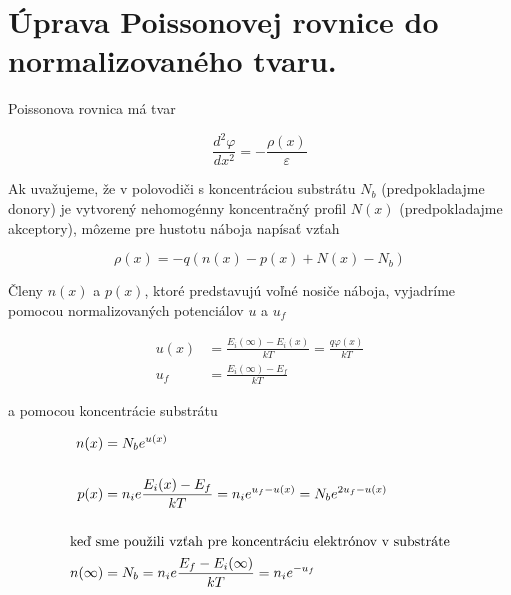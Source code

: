 
\chapter{Úprava Poissonovej rovnice do normalizovaného tvaru.} %
\label{app:AppendixB} %

Poissonova rovnica má tvar

\begin{equation}\label{eq:B.1}
\frac{d^{2}\varphi}{dx^2} = - \frac{\rho(x)}{\varepsilon}
\end{equation}

Ak uvažujeme, že v polovodiči s koncentráciou substrátu $N_b$
(predpokladajme donory) je vytvorený nehomogénny koncentračný profil
$N(x)$ (predpokladajme akceptory), môzeme pre hustotu náboja napísať
vzťah

\begin{equation}\label{eq:B.2}
\rho(x) = - q (n(x) - p(x) + N(x) -N_b)
\end{equation}

Členy $n(x)$ a $p(x)$, ktoré predstavujú  voľné  nosiče  náboja, vyjadríme pomocou normalizovaných potenciálov $u$ a $u_f$

\begin{subequations}\label{eq:B.3}
\begin{align}
u(x) &= \frac{E_i(\infty) - E_i(x)}{kT} = \frac{q\varphi(x)}{kT} \label{subeq:B.3a}\\[0.5cm]
u_f &= \frac{E_i(\infty) - E_f}{kT} \label{subeq:B.3b}
\end{align}
\end{subequations}

a pomocou koncentrácie substrátu

\begin{subequations}\label{eq:B.4}
\begin{align}
n(x) &= N_b {e}^{u(x)}\label{subeq:B.4a}\\[0.5cm]
p(x) &= n_i {e}\frac{E_i(x) - E_f}{kT} = n_i {e}^{u_f-u(x)} = N_b {e}^{2u_f-u(x)}\label{subeq:B.4b}\\[0.5cm]
\intertext{keď sme použili vzťah pre koncentráciu elektrónov v substráte}
n(\infty) &= N_b = n_i {e}\frac{E_f-E_i(\infty)}{kT} = n_i {e}^{-u_f}\label{subeq:B.4c}
\end{align}
\end{subequations}

